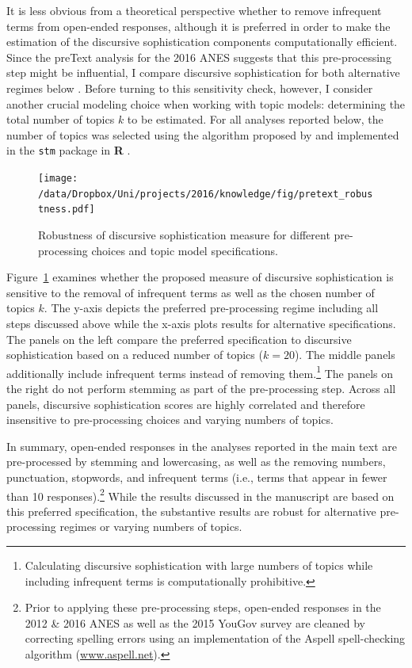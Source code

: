It is less obvious from a theoretical perspective whether to remove infrequent terms from open-ended responses, although it is preferred in order to make the estimation of the discursive sophistication components computationally efficient. Since the preText analysis for the 2016 ANES suggests that this pre-processing step might be influential, I compare discursive sophistication for both alternative regimes below \citep[c.f.,][]{denny2018text}. Before turning to this sensitivity check, however, I consider another crucial modeling choice when working with topic models: determining the total number of topics $k$ to be estimated. For all analyses reported below, the number of topics was selected using the algorithm proposed by \citet{lee2014low} and implemented in the \texttt{stm} package in \textbf{R} \citep{roberts2014stm}.

\begin{figure}[h]\centering
\texttt{[image: /data/Dropbox/Uni/projects/2016/knowledge/fig/pretext\_robustness.pdf]}
\caption[Robustness of discursive sophistication measure for different pre-processing choices and topic model specifications]{Robustness of discursive sophistication measure for different pre-processing choices and topic model specifications.}\label{fig:pretext_robustness}
\end{figure}

Figure~\ref{fig:pretext_robustness} examines whether the proposed measure of discursive sophistication is sensitive to the removal of infrequent terms as well as the chosen number of topics $k$. The y-axis depicts the preferred pre-processing regime including all steps discussed above while the x-axis plots results for alternative specifications. The panels on the left compare the preferred specification to discursive sophistication based on a reduced number of topics ($k=20$). The middle panels additionally include infrequent terms instead of removing them.\footnote{Calculating discursive sophistication with large numbers of topics while including infrequent terms is computationally prohibitive.} The panels on the right do not perform stemming as part of the pre-processing step. Across all panels, discursive sophistication scores are highly correlated and therefore insensitive to pre-processing choices and varying numbers of topics.

In summary, open-ended responses in the analyses reported in the main text are pre-processed by stemming and lowercasing, as well as the removing numbers, punctuation, stopwords, and infrequent terms (i.e., terms that appear in fewer than 10 responses).\footnote{Prior to applying these pre-processing steps, open-ended responses in the 2012 \& 2016 ANES as well as the 2015 YouGov survey are cleaned by correcting spelling errors using an implementation of the Aspell spell-checking algorithm (\url{www.aspell.net}).} While the results discussed in the manuscript are based on this preferred specification, the substantive results are robust for alternative pre-processing regimes or varying numbers of topics.



